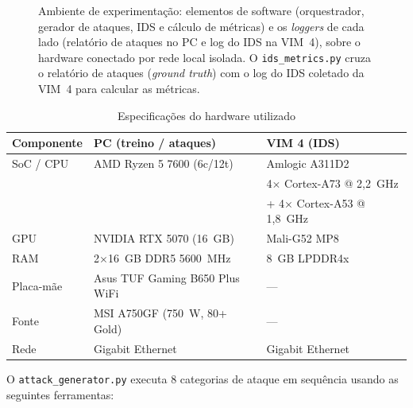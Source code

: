 \documentclass[12pt]{article}
\begin{document}
\begin{figure}[ht]
{}
\caption{Ambiente de experimentação: elementos de software (orquestrador, gerador de
ataques, IDS e cálculo de métricas) e os \textit{loggers} de cada lado (relatório de
ataques no PC e log do IDS na VIM~4), sobre o hardware conectado por rede local isolada.
O \texttt{ids\_metrics.py} cruza o relatório de ataques (\textit{ground truth}) com o log
do IDS coletado da VIM~4 para calcular as métricas.}
\label{fig:ambiente}
\end{figure}

\begin{table}[ht]
\centering
\caption{Especificações do hardware utilizado}
\label{tab:hardware}
\begin{tabular}{@{}lll@{}}
\toprule
\textbf{Componente} & \textbf{PC (treino / ataques)} & \textbf{VIM 4 (IDS)} \\ \midrule
SoC / CPU & AMD Ryzen 5 7600 (6c/12t) & Amlogic A311D2 \\
          &                            & 4$\times$ Cortex-A73 @ 2,2~GHz \\
          &                            & + 4$\times$ Cortex-A53 @ 1,8~GHz \\
GPU       & NVIDIA RTX 5070 (16~GB)    & Mali-G52 MP8 \\
RAM       & 2$\times$16~GB DDR5 5600~MHz & 8~GB LPDDR4x \\
Placa-mãe & Asus TUF Gaming B650 Plus WiFi & — \\
Fonte     & MSI A750GF (750~W, 80+ Gold) & — \\
Rede      & Gigabit Ethernet           & Gigabit Ethernet \\
\bottomrule
\end{tabular}
\end{table}

O \texttt{attack\_generator.py} executa 8
categorias de ataque em sequência usando as seguintes ferramentas:
\end{document}
